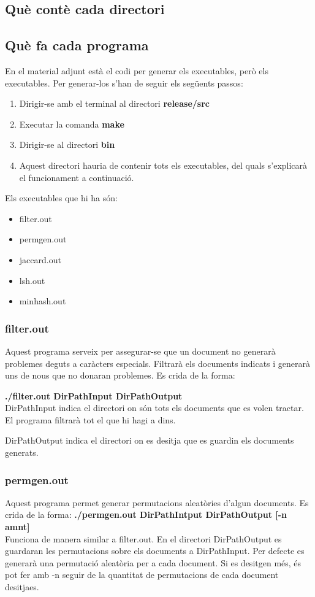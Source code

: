 \documentclass[a4paper, titlepage, 12pt]{report}
\begin{document}
\subsection{Què contè cada directori}

\subsection{Què fa cada programa}
En el material adjunt està el codi per generar els executables, però els executables. Per generar-los s'han de seguir els següents passos:
\begin{enumerate}
 \item Dirigir-se amb el terminal al directori \textbf{release/src}
 \item Executar la comanda \textbf{make}
 \item Dirigir-se al directori \textbf{bin}
 \item Aquest directori hauria de contenir tots els executables, del quals s'explicarà el funcionament a continuació.
\end{enumerate}

Els executables que hi ha són:
\begin{itemize}
 \item filter.out
 \item permgen.out
 \item jaccard.out
 \item lsh.out
 \item minhash.out
\end{itemize}

\subsubsection{filter.out}
Aquest programa serveix per assegurar-se que un document no generarà problemes deguts a caràcters especials. Filtrarà els documents indicats i generarà uns de nous que no donaran problemes. Es crida de la forma: 

\textbf{./filter.out DirPathInput DirPathOutput}
\\
DirPathInput indica el directori on són tots els documents que es volen tractar. El programa filtrarà tot el que hi hagi a dins.

DirPathOutput indica el directori on es desitja que es guardin els documents generats.
\subsubsection{permgen.out}
Aquest programa permet generar permutacions aleatòries d'algun documents. Es crida de la forma:
\textbf{./permgen.out DirPathIntput DirPathOutput [-n amnt]}
\\
Funciona de manera similar a filter.out. En el directori DirPathOutput es guardaran les permutacions sobre els documents a DirPathInput. Per defecte es generarà una permutació aleatòria per a cada document. Si es desitgen més, és pot fer amb -n seguir de la quantitat de permutacions de cada document desitjaes.
\end{document}
